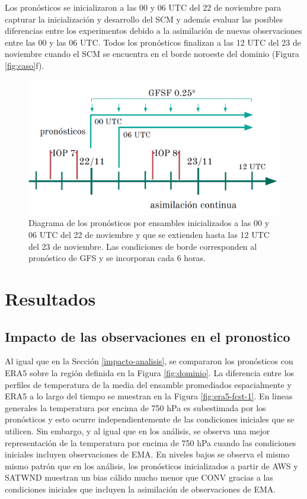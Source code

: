 \documentclass[12pt,oneside,a4paper]{reedthesis}
\begin{document}
Los pronósticos se inicializaron a las 00 y 06 UTC del 22 de noviembre para capturar la inicialización y desarrollo del SCM y además evaluar las posibles diferencias entre los experimentos debido a la asimilación de nuevas observaciones entre las 00 y las 06 UTC. Todos los pronósticos finalizan a las 12 UTC del 23 de noviembre cuando el SCM se encuentra en el borde noroeste del dominio (Figura \ref{fig:caso}f).


\begin{figure}

{\centering \includegraphics[width=0.8\linewidth,]{figure/forecast_diag} 

}

\caption{Diagrama de los pronósticos por ensambles inicializados a las 00 y 06 UTC del 22 de noviembre y que se extienden hasta las 12 UTC del 23 de noviembre. Las condiciones de borde corresponden al pronóstico de GFS y se incorporan cada 6 horas.}\label{fig:cycle-fcst}
\end{figure}
\hypertarget{resultados-1}{%
\section{Resultados}\label{resultados-1}}

\hypertarget{prono-impacto}{%
\subsection{Impacto de las observaciones en el pronostico}\label{prono-impacto}}

Al igual que en la Sección \ref{impacto-analisis}, se compararon los pronósticos con ERA5 sobre la región definida en la Figura \ref{fig:dominio}. La diferencia entre los perfiles de temperatura de la media del ensamble promediados espacialmente y ERA5 a lo largo del tiempo se muestran en la Figura \ref{fig:era5-fcst-1}. En lineas generales la temperatura por encima de 750 hPa es subestimada por los pronósticos y esto ocurre independientemente de las condiciones iniciales que se utilicen. Sin embargo, y al igual que en los análisis, se observa una mejor representación de la temperatura por encima de 750 hPa cuando las condiciones iniciales incluyen observaciones de EMA. En niveles bajos se observa el mismo mismo patrón que en los análisis, los pronósticos inicializados a partir de AWS y SATWND muestran un bias cálido mucho menor que CONV gracias a las condiciones iniciales que incluyen la asimilación de observaciones de EMA.
\end{document}
